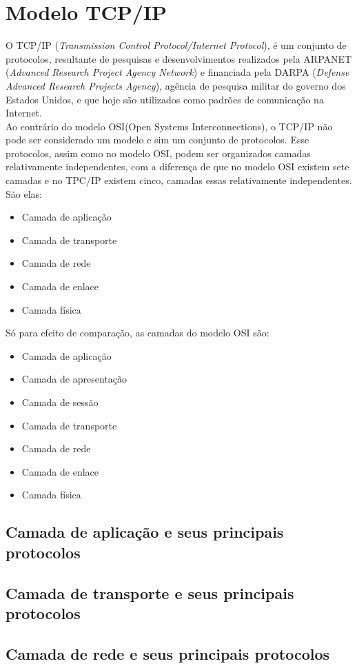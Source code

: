 \section{Modelo TCP/IP}
O TCP/IP (\textit{Transmission Control Protocol/Internet Protocol}), é um conjunto de protocolos, resultante de pesquisas e desenvolvimentos realizados pela ARPANET (\textit{Advanced Research Project Agency Network}) e financiada pela DARPA (\textit{Defense Advanced Research Projects Agency}), agência de pesquisa militar do governo dos Estados Unidos, e que hoje são utilizados como padrões de comunicação na Internet.\\
Ao contrário do modelo OSI(Open Systems Interconnections), o TCP/IP não pode ser considerado um modelo e sim um conjunto de protocolos. Esse protocolos, assim como no modelo OSI, podem ser organizados camadas relativamente independentes, com a diferença de que no modelo OSI existem sete camadas e no TPC/IP existem cinco, camadas essas relativamente independentes. São elas:
\begin{itemize}
\item Camada de aplicação
\item Camada de transporte
\item Camada de rede
\item Camada de enlace
\item Camada física
\end{itemize}

Só para efeito de comparação, as camadas do modelo OSI são:
\begin{itemize}
\item Camada de aplicação
\item Camada de apresentação
\item Camada de sessão
\item Camada de transporte
\item Camada de rede
\item Camada de enlace
\item Camada física
\end{itemize}

\subsection{Camada de aplicação e seus principais protocolos}
\subsection{Camada de transporte e seus principais protocolos}
\subsection{Camada de rede e seus principais protocolos}
